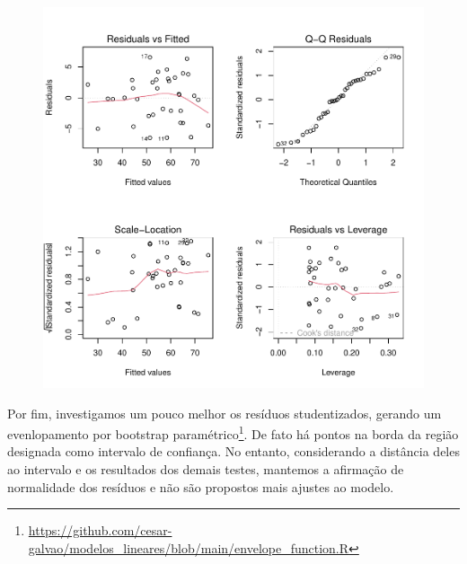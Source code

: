 \documentclass[
  letterpaper,
  DIV=11,
  numbers=noendperiod]{scrartcl}
\begin{document}
\begin{figure}

{\centering \includegraphics{lista2_files/figure-pdf/unnamed-chunk-21-1.pdf}

}

\end{figure}

Por fim, investigamos um pouco melhor os resíduos studentizados, gerando
um evenlopamento por bootstrap paramétrico\footnote{\url{https://github.com/cesar-galvao/modelos_lineares/blob/main/envelope_function.R}}.
De fato há pontos na borda da região designada como intervalo de
confiança. No entanto, considerando a distância deles ao intervalo e os
resultados dos demais testes, mantemos a afirmação de normalidade dos
resíduos e não são propostos mais ajustes ao modelo.
\end{document}
